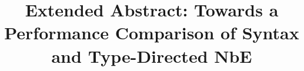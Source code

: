 \documentclass[review,sigplan,nonacm]{acmart}
\title{Extended Abstract: Towards a Performance Comparison of Syntax and Type-Directed NbE}
\begin{document}
\begin{abstract}
        
\end{abstract}

\maketitle


%


%

\end{document}
